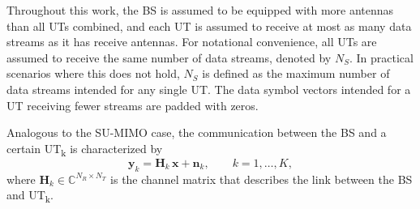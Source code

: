 Throughout this work, the \ac{BS} is assumed to be equipped with more antennas than all \acp{UT} combined, and each \ac{UT} is assumed to receive at most as many data streams as it has receive antennas.
For notational convenience, all \acp{UT} are assumed to receive the same number of data streams, denoted by $N_S$. In practical scenarios where this does not hold, $N_S$ is defined as the maximum number of data streams intended for any single \ac{UT}. The data symbol vectors intended for a \ac{UT} receiving fewer streams are padded with zeros.

Analogous to the \ac{SU}-\ac{MIMO} case, the communication between the \ac{BS} and a certain \ac{UT}\textsubscript{k} is characterized by
\begin{equation}
    \mathbf{y}_k = \mathbf{H}_k \, \mathbf{x} + \mathbf{n}_k, \qquad k = 1, \dots, K,
\label{eq:mu_mimo_io}
\end{equation}
where $\mathbf{H}_k \in \mathbb{C}^{N_R \times N_T}$ is the channel matrix that describes the link between the \ac{BS} and \ac{UT}\textsubscript{k}.


